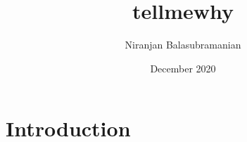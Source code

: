\documentclass{article}
\title{tellmewhy}
\author{Niranjan Balasubramanian}
\date{December 2020}
\begin{document}
\maketitle

\section{Introduction}
\end{document}
